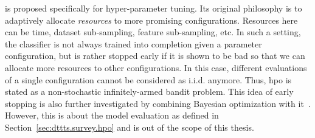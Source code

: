 \begin{remark}
\begin{leftbar}[remarkbar]
\Hyperband is proposed specifically for hyper-parameter tuning. Its original philosophy is to adaptively allocate \emph{resources} to more promising configurations. Resources here can be time, dataset sub-sampling, feature sub-sampling, etc. In such a setting, the classifier is not always trained into completion given a parameter configuration, but is rather stopped early if it is shown to be bad so that we can allocate more resources to other configurations. In this case, different evaluations of a single configuration cannot be considered as i.i.d. anymore. Thus, \gls{hpo} is stated as a non-stochastic infinitely-armed bandit problem. This idea of early stopping is also further investigated by combining Bayesian optimization with it~\citep{falkner2018bohb}. However, this is about the model evaluation as defined in Section~\ref{sec:dttts.survey.hpo} and is out of the scope of this thesis.
\end{leftbar}
\end{remark}
